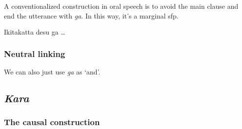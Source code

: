 \documentclass[UTF8, a4paper, oneside, scheme=plain]{ctexrep}
\newcommand{\corpus}[1]{\emph{#1}}
\newcommand{\translate}[1]{`#1'}
\begin{document}
A conventionalized construction in oral speech is to avoid the main clause 
and end the utterance with \corpus{ga}.
In this way, it's a marginal \ac{sfp}.

\begin{exe}
    \ex Ikitakatta desu ga \dots
\end{exe}

\subsubsection{Neutral linking}

We can also just use \corpus{ga} as \translate{and}.

\subsection{\corpus{Kara}}

\subsubsection{The causal construction}



\end{document}
